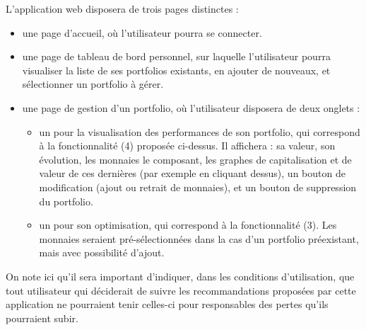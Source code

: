 \documentclass[a4paper]{article}
\begin{document}
L'application web disposera de trois pages distinctes :
\begin{itemize}
    \item une page d'accueil, où l'utilisateur pourra se connecter.
    \item une page de tableau de bord personnel, sur laquelle l'utilisateur pourra visualiser la liste de ses portfolios existants, en ajouter de nouveaux, et sélectionner un portfolio à gérer.
    \item une page de gestion d'un portfolio, où l'utilisateur disposera de deux onglets :
    \begin{itemize}
        \item un pour la visualisation des performances de son portfolio, qui correspond à la fonctionnalité (4) proposée ci-dessus. Il affichera : sa valeur, son évolution, les monnaies le composant, les graphes de capitalisation et de valeur de ces dernières (par exemple en cliquant dessus), un bouton de modification (ajout ou retrait de monnaies), et un bouton de suppression du portfolio.
        \item un pour son optimisation, qui correspond à la fonctionnalité (3). Les monnaies seraient pré-sélectionnées dans la cas d'un portfolio préexistant, mais avec possibilité d'ajout.
    \end{itemize}
\end{itemize}\medskip

On note ici qu'il sera important d'indiquer, dans les conditions d'utilisation, que tout utilisateur qui déciderait de suivre les recommandations proposées par cette application ne pourraient tenir celles-ci pour responsables des pertes qu'ils pourraient subir.

\printbibliography
\end{document}

